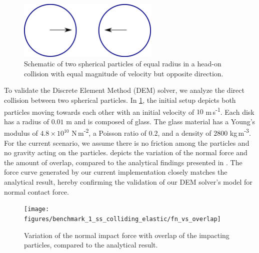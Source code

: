 \documentclass[preprint,12pt]{elsarticle}
\begin{document}
\begin{figure}[!htpb]
  \centering
  \includegraphics[width=0.6\textwidth]{images/results_dem_1_validation_particle_particle_impact/dem_01_head_on_schematic}
  \caption{Schematic of two spherical particles of equal radius in a
    head-on collision with equal magnitude of velocity but opposite direction.}
  \label{fig:result:dem_1_schematic}
\end{figure}
To validate the Discrete Element Method (DEM) solver, we analyze the direct
collision between two spherical particles.  In
\cref{fig:result:dem_1_schematic}, the initial setup depicts both particles
moving towards each other with an initial velocity of $10$
m\,s\textsuperscript{-1}.  Each disk has a radius of $0.01$ m and is composed
of glass. The glass material has a Young's modulus of $4.8 \times 10^{10}$
N\,m\textsuperscript{-2}, a Poisson ratio of $0.2$, and a density of $2800$
kg\,m\textsuperscript{-3}.  For the current scenario, we assume there is no
friction among the particles and no gravity acting on the particles.
 depicts the variation of the normal
force and the amount of overlap, compared to the analytical findings presented
in \cite{chung2011benchmark}. The force curve generated by our current
implementation closely matches the analytical result, hereby confirming the
validation of our DEM solver's model for normal contact force.
\begin{figure}[!htpb]
  \centering
  \texttt{[image: figures/benchmark\_1\_ss\_colliding\_elastic/fn\_vs\_overlap]}
  \caption{Variation of the normal impact force with overlap of the impacting
    particles, compared to the analytical result.}
  \label{fig:result:dem_1_force_vs_overlap}
\end{figure}


\FloatBarrier%
\end{document}
